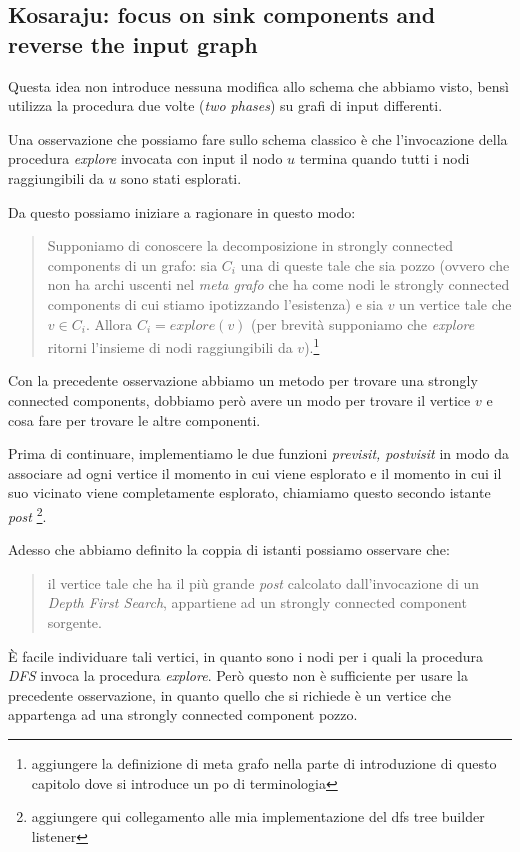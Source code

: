 \subsection{Kosaraju: focus on sink components and reverse the input
  graph}
\label{subsection:kosaraju-algorithm}
Questa idea non introduce nessuna modifica allo schema che abbiamo
visto, bens\`i utilizza la procedura due volte (\emph{two phases}) su
grafi di input differenti.

Una osservazione che possiamo fare sullo schema classico \`e che
l'invocazione della procedura \emph{explore} invocata con input il
nodo $u$ termina quando tutti i nodi raggiungibili da $u$ sono stati
esplorati.

Da questo possiamo iniziare a ragionare in questo modo:
\begin{quotation}
  Supponiamo di conoscere la decomposizione in strongly connected
  components di un grafo: sia $C_{i}$ una di queste tale che sia pozzo
  (ovvero che non ha archi uscenti nel \emph{meta grafo} che ha come
  nodi le strongly connected components di cui stiamo ipotizzando
  l'esistenza) e sia $v$ un vertice tale che $v \in C_{i}$. Allora
  $C_{i} = explore(v)$ (per brevit\`a supponiamo che \emph{explore}
  ritorni l'insieme di nodi raggiungibili da $v$).\footnote{aggiungere
    la definizione di meta grafo nella parte di introduzione di questo
    capitolo dove si introduce un po di terminologia}
\end{quotation}

Con la precedente osservazione abbiamo un metodo per trovare una
strongly connected components, dobbiamo per\`o avere un modo per
trovare il vertice $v$ e cosa fare per trovare le altre componenti.

Prima di continuare, implementiamo le due funzioni \emph{previsit,
  postvisit} in modo da associare ad ogni vertice il momento in cui
viene esplorato e il momento in cui il suo vicinato viene
completamente esplorato, chiamiamo questo secondo istante \emph{post}
\footnote{aggiungere qui collegamento alle mia implementazione del dfs
  tree builder listener}.

Adesso che abbiamo definito la coppia di istanti possiamo osservare
che: 
\begin{quotation}
  il vertice tale che ha il pi\`u grande \emph{post} calcolato
  dall'invocazione di un \emph{Depth First Search}, appartiene ad un
  strongly connected component sorgente.
\end{quotation}

\`E facile individuare tali vertici, in quanto sono i nodi per i quali
la procedura \emph{DFS} invoca la procedura \emph{explore}. Per\`o
questo non \`e sufficiente per usare la precedente osservazione, in
quanto quello che si richiede \`e un vertice che appartenga ad una
strongly connected component pozzo.

